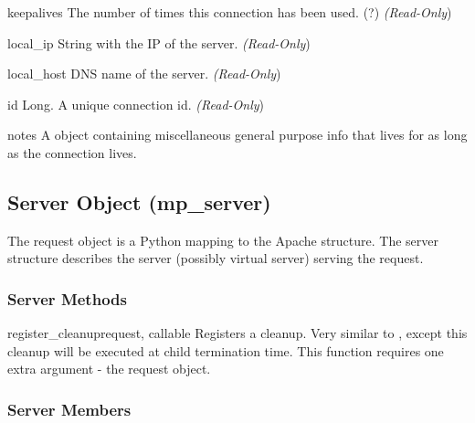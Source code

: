 \begin{memberdesc}[connection]{keepalives}
The number of times this connection has been used. (?)
\emph{(Read-Only})
\end{memberdesc}

\begin{memberdesc}[connection]{local_ip}
String with the IP of the server.
\emph{(Read-Only})
\end{memberdesc}

\begin{memberdesc}[connection]{local_host}
DNS name of the server.
\emph{(Read-Only})
\end{memberdesc}

\begin{memberdesc}[connection]{id}
Long. A unique connection id.
\emph{(Read-Only})
\end{memberdesc}

\begin{memberdesc}[connection]{notes}
A  object containing miscellaneous general purpose info that lives for
as long as the connection lives. 
\end{memberdesc}


\subsection{Server Object (mp_server)\label{pyapi-mpserver}}

The request object is a Python mapping to the Apache 
structure. The server structure describes the server (possibly virtual
server) serving the request.

\subsubsection{Server Methods\label{pyapi-mpsrv-meth}}

\begin{methoddesc}[server]{register_cleanup}{request, callable}
Registers a cleanup. Very similar to , except
this cleanup will be executed at child termination time. This function
requires one extra argument - the request object.
\end{methoddesc}

\subsubsection{Server Members\label{pyapi-mpsrv-mem}}

